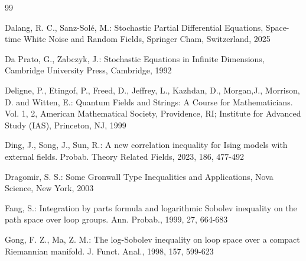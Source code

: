 \documentclass[11pt]{article}
\numberwithin{equation}{section}%
\numberwithin{figure}{section}%
\theoremstyle{remark}
\begin{document}
\begin{thebibliography}{99}
		
		
	 Dalang, R. C.,  Sanz-Solé, M.: Stochastic Partial Differential Equations, Space-time White Noise and Random Fields, Springer Cham, Switzerland, 2025
	 
	 	
	 Da Prato, G., Zabczyk, J.: Stochastic Equations in Infinite Dimensions, Cambridge University Press, Cambridge, 1992
		
		
		
		
		Deligne, P., Etingof, P., Freed, D., Jeffrey, L., Kazhdan, D., Morgan,J., Morrison, D. and Witten, E.: Quantum Fields and Strings: A Course for Mathematicians. Vol. 1, 2, American Mathematical Society, Providence, RI; Institute for Advanced Study (IAS), Princeton, NJ, 1999
		
		Ding, J., Song, J., Sun, R.: A new correlation inequality for Ising models with external fields. Probab. Theory Related Fields, 2023, 186, 477-492
		
		Dragomir, S. S.: Some Gronwall Type Inequalities and Applications, Nova Science, New York, 2003
		
		
		
		
		Fang, S.: Integration by parts formula and logarithmic Sobolev inequality on the path space over loop groups. Ann. Probab., 1999, 27, 664-683
		
		
		
		Gong, F. Z., Ma, Z. M.: The log-Sobolev inequality on loop space over a compact Riemannian manifold. J. Funct. Anal., 1998, 157, 599-623
		

\end{thebibliography}
\end{document}
